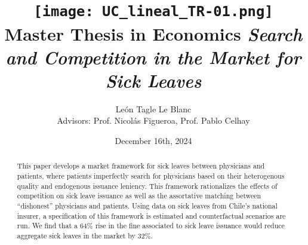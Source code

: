 \documentclass[11pt]{article}
\title{\texttt{[image: UC\_lineal\_TR-01.png]} \linebreak \linebreak 
Master Thesis in Economics \linebreak \linebreak 
{\fontsize{22pt}{50pt}\selectfont\textit{Search and Competition \vspace{10pt}\linebreak  in the Market for Sick Leaves \vspace{20pt}}}}
\author{León Tagle Le Blanc \\
Advisors: Prof. Nicolás Figueroa, Prof. Pablo Celhay}
\date{December 16th, 2024}
\begin{document}
\begin{titlepage}
\maketitle
\thispagestyle{empty}

\vspace{4em}

\begin{abstract}
        This paper develops a market framework for sick leaves between physicians and patients, where patients imperfectly search for physicians based on their heterogenous quality and endogenous issuance leniency. This framework rationalizes the effects of competition on sick leave issuance as well as the assortative matching between ``dishonest'' physicians and patients. Using data on sick leaves from Chile's national insurer, a specification of this framework is estimated and counterfactual scenarios are run. We find that a 64\% rise in the fine associated to sick leave issuance would reduce aggregate sick leaves in the market by 32\%.
\end{abstract}

\newpage
\tableofcontents
\setcounter{page}{0}
\thispagestyle{empty}

\end{titlepage}

\setlength{\parskip}{6pt}









\newpage







\newpage






\newpage


\end{document}
